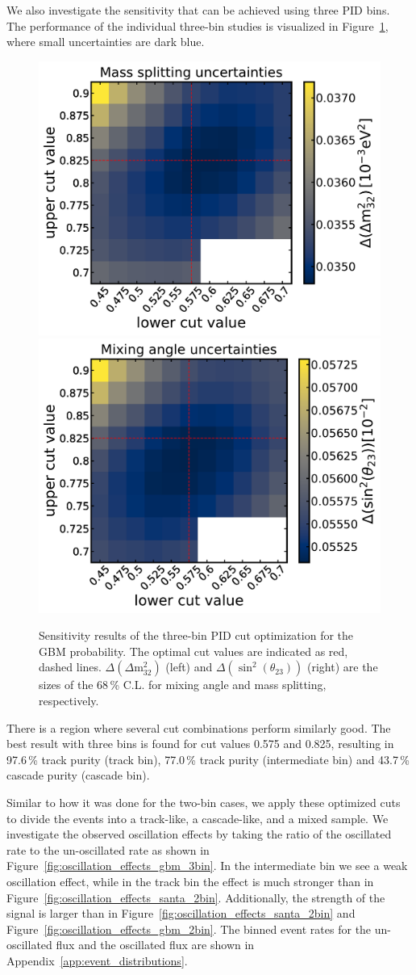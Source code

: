 We also investigate the sensitivity that can be achieved using three PID bins.
The performance of the individual three-bin studies is visualized in Figure~\ref{fig:optimizing_three_bins}, where small uncertainties are dark blue.
\begin{figure}[h]
    \centering
    \includegraphics[width=0.49\linewidth]{figures/three_bin_optimization_mass_splitting_2dhist_cividis_cut_x.pdf}
    \includegraphics[width=0.49\linewidth]{figures/three_bin_optimization_mixing_angle_2dhist_cividis_cut_x.pdf}
    \caption[Sensitivity results of the three-bin PID cut optimization]{Sensitivity results of the three-bin PID cut optimization for the GBM probability. The optimal cut values are indicated as red, dashed lines. $\Delta(\Delta \mathrm{m}^{2}_{32})$ (left) and $\Delta(\sin^{2}(\theta_{23}))$ (right) are the sizes of the $68$\,\% C.L. for mixing angle and mass splitting, respectively.}
    \label{fig:optimizing_three_bins}
\end{figure}
There is a region where several cut combinations perform similarly good.
The best result with three bins is found for cut values 0.575 and 0.825, resulting in 97.6\,\% track purity (track bin), 77.0\,\% track purity (intermediate bin) and 43.7\,\% cascade purity (cascade bin).

Similar to how it was done for the two-bin cases, we apply these optimized cuts to divide the events into a track-like, a cascade-like, and a mixed sample.
We investigate the observed oscillation effects by taking the ratio of the oscillated rate to the un-oscillated rate as shown in Figure~\ref{fig:oscillation_effects_gbm_3bin}.
In the intermediate bin we see a weak oscillation effect, while in the track bin the effect is much stronger than in Figure~\ref{fig:oscillation_effects_santa_2bin}.
Additionally, the strength of the signal is larger than in Figure~\ref{fig:oscillation_effects_santa_2bin} and Figure~\ref{fig:oscillation_effects_gbm_2bin}.
The binned event rates for the un-oscillated flux and the oscillated flux are shown in Appendix~\ref{app:event_distributions}.

